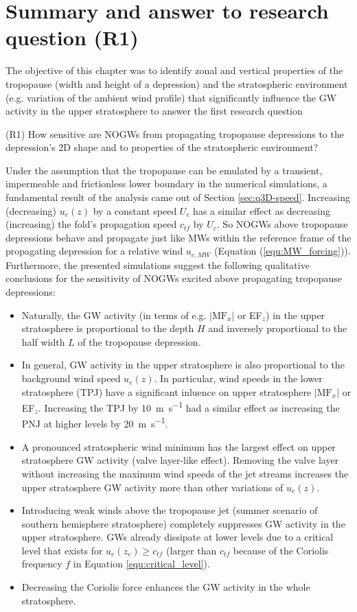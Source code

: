 \section{Summary and answer to research question (R1)}
\label{sec:q3D-summary}
The objective of this chapter was to identify zonal and vertical properties of the tropopause (width and height of a depression) and the stratospheric environment (e.g. variation of the ambient wind profile) that significantly influence the GW activity in the upper stratosphere to answer the first research question
\begin{tcolorbox}[]
    (R1) How sensitive are NOGWs from propagating tropopause depressions to the depression's 2D shape and to properties of the stratospheric environment?
\end{tcolorbox}
Under the assumption that the tropopause can be emulated by a transient, impermeable and frictionless lower boundary in the numerical simulations, a fundamental result of the analysis came out of Section \ref{sec:q3D-speed}. Increasing (decreasing) $u_e(z)$ by a constant speed $U_c$ has a similar effect as decreasing (increasing) the fold's propagation speed $c_{tf}$ by $U_c$. So NOGWs above tropopause depressions behave and propagate just like MWs within the reference frame of the propagating depression for a relative wind $u_{e,MW}$ (Equation (\ref{equ:MW_forcing})). \\
Furthermore, the presented simulations suggest the following qualitative conclusions for the sensitivity of NOGWs excited above propagating tropopause depressions:
\begin{itemize}
    \item Naturally, the GW activity (in terms of e.g. $\left| \mathrm{MF}_x \right|$ or EF$_z$) in the upper stratosphere is proportional to the depth $H$ and inversely proportional to the half width $L$ of the tropopause depression.
    \item In general, GW activity in the upper stratosphere is also proportional to the background wind speed $u_e(z)$. In particular, wind speeds in the lower stratosphere (TPJ) have a significant inluence on upper stratosphere $\left| \mathrm{MF}_x \right|$ or EF$_z$. Increasing the TPJ by \SI{10}{\meter\per\second} had a similar effect as increasing the PNJ at higher levels by \SI{20}{\meter\per\second}.
    \item A pronounced stratospheric wind minimum has the largest effect on upper stratosphere GW activity (valve layer-like effect). Removing the valve layer without increasing the maximum wind speeds of the jet streams increases the upper stratosphere GW activity more than other variations of $u_e(z)$. 
    \item Introducing weak winds above the tropopause jet (summer scenario of southern hemisphere stratosphere) completely suppresses GW activity in the upper stratosphere. GWs already dissipate at lower levels due to a critical level that exists for $u_e(z_c) \geq c_{tf}$ (larger than $c_{tf}$ because of the Coriolis frequency $f$ in Equation \ref{equ:critical_level}).
    \item Decreasing the Coriolis force enhances the GW activity in the whole stratosphere.
\end{itemize}
